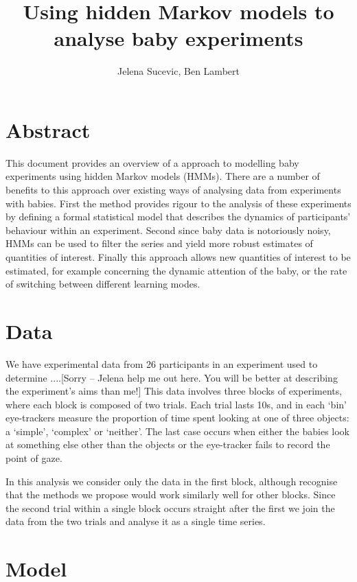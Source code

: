 \documentclass[9pt]{article}
\title{Using hidden Markov models to analyse baby experiments}
\author{Jelena Sucevic, Ben Lambert}
\begin{document}
\maketitle

\section{Abstract}
This document provides an overview of a approach to modelling baby experiments using hidden Markov models (HMMs). There are a number of benefits to this approach over existing ways of analysing data from experiments with babies. First the method provides rigour to the analysis of these experiments by defining a formal statistical model that describes the dynamics of participants' behaviour within an experiment. Second since baby data is notoriously noisy, HMMs can be used to filter the series and yield more robust estimates of quantities of interest. Finally this approach allows new quantities of interest to be estimated, for example concerning the dynamic attention of the baby, or the rate of switching between different learning modes.

\section{Data}
We have experimental data from 26 participants in an experiment used to determine ....[Sorry -- Jelena help me out here. You will be better at describing the experiment's aims than me!] This data involves three blocks of experiments, where each block is composed of two trials. Each trial lasts 10s, and in each `bin' eye-trackers measure the proportion of time spent looking at one of three objects: a `simple', `complex' or `neither'. The last case occurs when either the babies look at something else other than the objects or the eye-tracker fails to record the point of gaze.

In this analysis we consider only the data in the first block, although recognise that the methods we propose would work similarly well for other blocks. Since the second trial within a single block occurs straight after the first we join the data from the two trials and analyse it as a single time series.

\section{Model}
\end{document}
